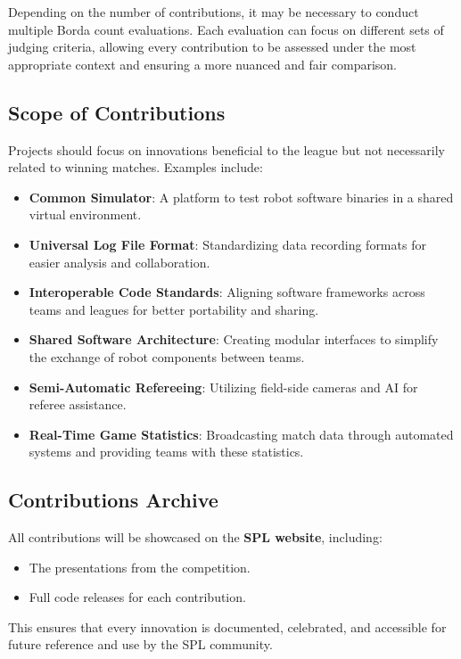 Depending on the number of contributions, it may be necessary to conduct multiple Borda count evaluations. Each evaluation can focus on different sets of judging criteria, allowing every contribution to be assessed under the most appropriate context and ensuring a more nuanced and fair comparison.

\subsection{Scope of Contributions}
Projects should focus on innovations beneficial to the league but not necessarily related to winning matches. Examples include:
\begin{itemize}
    \item \textbf{Common Simulator}: A platform to test robot software binaries in a shared virtual environment.
    \item \textbf{Universal Log File Format}: Standardizing data recording formats for easier analysis and collaboration.
    \item \textbf{Interoperable Code Standards}: Aligning software frameworks across teams and leagues for better portability and sharing.
    \item \textbf{Shared Software Architecture}: Creating modular interfaces to simplify the exchange of robot components between teams.
    \item \textbf{Semi-Automatic Refereeing}: Utilizing field-side cameras and AI for referee assistance.
    \item \textbf{Real-Time Game Statistics}: Broadcasting match data through automated systems and providing teams with these statistics.
\end{itemize}

\subsection{Contributions Archive}
All contributions will be showcased on the \textbf{SPL website}, including:
\begin{itemize}
    \item The presentations from the competition.
    \item Full code releases for each contribution.
\end{itemize}
This ensures that every innovation is documented, celebrated, and accessible for future reference and use by the SPL community.
